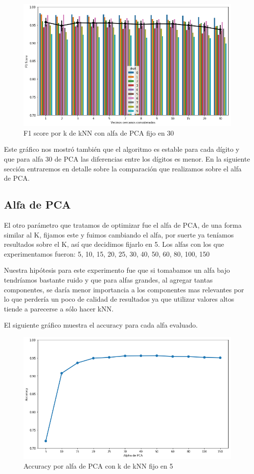 \begin{figure}[H]
    \begin{center}
      \includegraphics[width=0.8\columnwidth]{imagenes/F1_alpha_30.png}
      \caption{F1 score por k de kNN con alfa de PCA fijo en 30}
    \end{center}
\end{figure}

Este gráfico nos mostró también que el algoritmo es estable para cada dígito y que para alfa 30 de PCA las diferencias entre los dígitos es menor. En la siguiente sección entraremos en detalle sobre la comparación que realizamos sobre el alfa de PCA.

\subsection{Alfa de PCA}

El otro parámetro que tratamos de optimizar fue el alfa de PCA, de una forma similar al K, fijamos este y fuimos cambiando el alfa, por suerte ya teníamos resultados sobre el K, así que decidimos fijarlo en 5. Los alfas con los que experimentamos fueron: 5, 10, 15, 20, 25, 30, 40, 50, 60, 80, 100, 150

Nuestra hipótesis para este experimento fue que si tomabamos un alfa bajo tendríamos bastante ruido y que para alfas grandes, al agregar tantas componentes, se daría menor importancia a los componentes mas relevantes por lo que perdería un poco de calidad de resultados ya que utilizar valores altos tiende a parecerse a sólo hacer kNN.

El siguiente gráfico muestra el accuracy para cada alfa evaluado.

\begin{figure}[H]
    \begin{center}
      \includegraphics[width=0.8\columnwidth]{imagenes/Accuracy_all_alpha.png}
      \caption{Accuracy por alfa de PCA con k de kNN fijo en 5}
    \end{center}
\end{figure}

